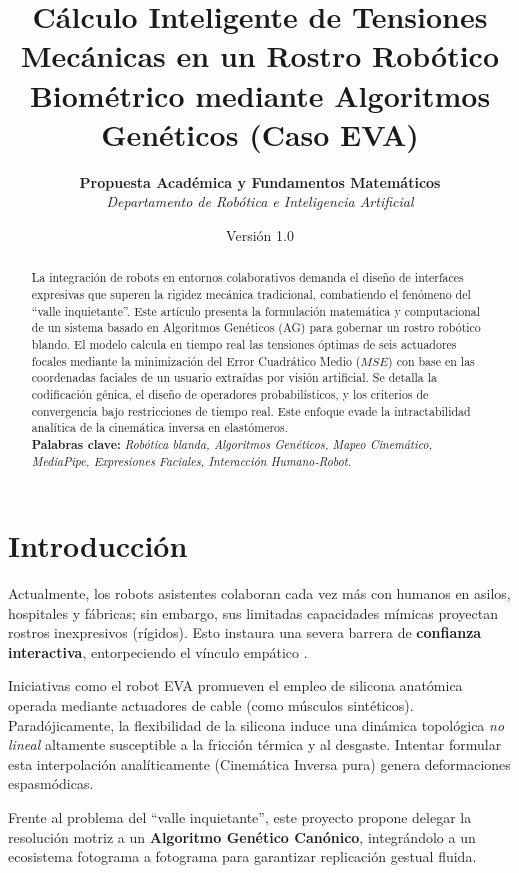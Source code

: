 \documentclass[11pt, a4paper, twocolumn]{article}
\title{\vspace{-2cm}\huge\textbf{Cálculo Inteligente de Tensiones Mecánicas en un Rostro Robótico Biométrico mediante Algoritmos Genéticos (Caso EVA)}}
\author{\normalsize \textbf{Propuesta Académica y Fundamentos Matemáticos} \\ \textit{Departamento de Robótica e Inteligencia Artificial}}
\date{\vspace{-0.5cm}\normalsize Versión 1.0}
\begin{document}
\maketitle
\thispagestyle{empty}

\begin{abstract}
\noindent La integración de robots en entornos colaborativos demanda el diseño de interfaces expresivas que superen la rigidez mecánica tradicional, combatiendo el fenómeno del ``valle inquietante''. Este artículo presenta la formulación matemática y computacional de un sistema basado en Algoritmos Genéticos (AG) para gobernar un rostro robótico blando. El modelo calcula en tiempo real las tensiones óptimas de seis actuadores focales mediante la minimización del Error Cuadrático Medio ($MSE$) con base en las coordenadas faciales de un usuario extraídas por visión artificial. Se detalla la codificación génica, el diseño de operadores probabilísticos, y los criterios de convergencia bajo restricciones de tiempo real. Este enfoque evade la intractabilidad analítica de la cinemática inversa en elastómeros.
\vspace{0.3cm}\\
\noindent \textbf{Palabras clave:} \textit{Robótica blanda, Algoritmos Genéticos, Mapeo Cinemático, MediaPipe, Expresiones Faciales, Interacción Humano-Robot.}
\end{abstract}

\section{Introducción}
Actualmente, los robots asistentes colaboran cada vez más con humanos en asilos, hospitales y fábricas; sin embargo, sus limitadas capacidades mímicas proyectan rostros inexpresivos (rígidos). Esto instaura una severa barrera de \textbf{confianza interactiva}, entorpeciendo el vínculo empático \cite{Chen2021}. 

Iniciativas como el robot EVA promueven el empleo de silicona anatómica operada mediante actuadores de cable (como músculos sintéticos). Paradójicamente, la flexibilidad de la silicona induce una dinámica topológica \textit{no lineal} altamente susceptible a la fricción térmica y al desgaste.
Intentar formular esta interpolación analíticamente (Cinemática Inversa pura) genera deformaciones espasmódicas. 

Frente al problema del ``valle inquietante'', este proyecto propone delegar la resolución motriz a un \textbf{Algoritmo Genético Canónico}, integrándolo a un ecosistema fotograma a fotograma para garantizar replicación gestual fluida. 
\end{document}

